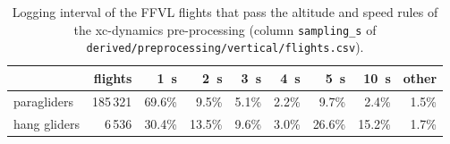 \begin{table}
\centering
\small
\begin{tabular}{@{}l r *{7}{r}@{}}
\toprule
 & flights & 1~s & 2~s & 3~s & 4~s & 5~s & 10~s & other \\
\midrule
paragliders & 185\,321 & 69.6\% & 9.5\% & 5.1\% & 2.2\% & 9.7\% & 2.4\% & 1.5\% \\
hang gliders & 6\,536 & 30.4\% & 13.5\% & 9.6\% & 3.0\% & 26.6\% & 15.2\% & 1.7\% \\
\bottomrule
\end{tabular}
\caption{Logging interval of the FFVL flights that pass the altitude and speed rules of the
xc-dynamics pre-processing (column \texttt{sampling\_s} of
\texttt{derived/preprocessing/vertical/flights.csv}).}
\label{tab:cadence}
\end{table}
